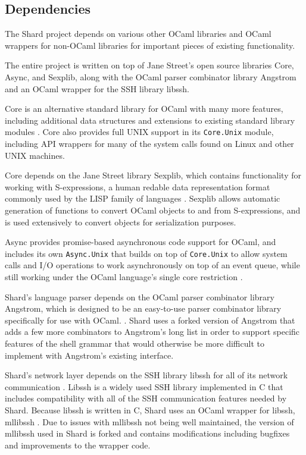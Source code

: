 \documentclass[twoside]{report}
\begin{document}
\subsection{Dependencies}
The Shard project depends on various other OCaml libraries and OCaml wrappers for non-OCaml libraries for important pieces of existing functionality.

The entire project is written on top of Jane Street's open source libraries Core, Async, and Sexplib, along with the OCaml parser combinator library Angstrom and an OCaml wrapper for the SSH library libssh.

Core is an alternative standard library for OCaml with many more features, including additional data structures and extensions to existing standard library modules \cite{ocamlcore}.
Core also provides full UNIX support in its \texttt{Core.Unix} module, including API wrappers for many of the system calls found on Linux and other UNIX machines.

Core depends on the Jane Street library Sexplib, which contains functionality for working with S-expressions, a human redable data representation format commonly used by the LISP family of languages \cite{mccarthy1960recursive}. Sexplib allows automatic generation of functions to convert OCaml objects to and from S-expressions, and is used extensively to convert objects for serialization purposes.

Async provides promise-based asynchronous code support for OCaml, and includes its own \texttt{Async.Unix} that builds on top of \texttt{Core.Unix} to allow system calls and I/O operations to work asynchronously on top of an event queue, while still working under the OCaml language's single core restriction \cite{ocamlasync}.

Shard's language parser depends on the OCaml parser combinator library Angstrom, which is designed to be an easy-to-use parser combinator library specifically for use with OCaml. \cite{ocamlangstrom}.
Shard uses a forked version of Angstrom that adds a few more combinators to Angstrom's long list in order to support specific features of the shell grammar that would otherwise be more difficult to implement with Angstrom's existing interface.

Shard's network layer depends on the SSH library libssh for all of its network communication \cite{libssh}.
Libssh is a widely used SSH library implemented in C that includes compatibility with all of the SSH communication features needed by Shard.
Because libssh is written in C, Shard uses an OCaml wrapper for libssh, mllibssh \cite{mllibssh}.
Due to issues with mllibssh not being well maintained, the version of mllibssh used in Shard is forked and contains modifications including bugfixes and improvements to the wrapper code.
\end{document}
